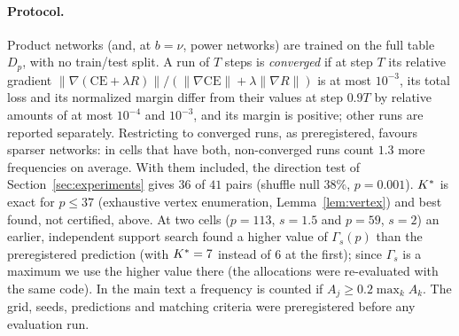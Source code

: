 \paragraph{Protocol.} Product networks (and, at $b=\nu$, power networks) are trained on the full table $D_p$, with no train/test split. A run of $T$ steps is \emph{converged} if at step $T$ its relative gradient $\|\nabla(\mathrm{CE}+\lambda R)\|/(\|\nabla\mathrm{CE}\|+\lambda\|\nabla R\|)$ is at most $10^{-3}$, its total loss and its normalized margin differ from their values at step $0.9T$ by relative amounts of at most $10^{-4}$ and $10^{-3}$, and its margin is positive; other runs are reported separately. Restricting to converged runs, as preregistered, favours sparser networks: in cells that have both, non-converged runs count $1.3$ more frequencies on average. With them included, the direction test of Section~\ref{sec:experiments} gives $36$ of $41$ pairs (shuffle null $38\%$, $p=0.001$). $K^{*}$ is exact for $p\le37$ (exhaustive vertex enumeration, Lemma~\ref{lem:vertex}) and best found, not certified, above. At two cells ($p=113$, $s=1.5$ and $p=59$, $s=2$) an earlier, independent support search found a higher value of $\Gamma_s(p)$ than the preregistered prediction (with $K^{*}=7$ instead of $6$ at the first); since $\Gamma_s$ is a maximum we use the higher value there (the allocations were re-evaluated with the same code). In the main text a frequency is counted if $A_j\ge0.2\max_kA_k$. The grid, seeds, predictions and matching criteria were preregistered before any evaluation run.

